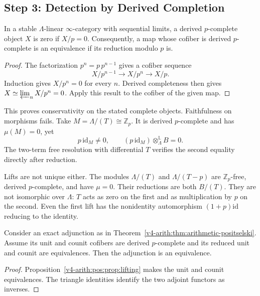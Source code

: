 \subsection{Step 3: Detection by Derived Completion}
\label{v4-arith:pos:step-3}

\begin{proposition}
\label{v4-arith:pos:prop:lifting}
In a stable \(\Lambda\)-linear \(\infty\)-category with sequential limits,
a derived \(p\)-complete object \(X\) is zero if \(X/p=0\).
Consequently, a map whose cofiber is derived \(p\)-complete
is an equivalence if its reduction modulo \(p\) is.
\end{proposition}
\begin{proof}
The factorization \(p^n=p\,p^{n-1}\) gives a cofiber sequence
\[
 X/p^{n-1}\longrightarrow X/p^n\longrightarrow X/p.
\]
Induction gives \(X/p^n=0\) for every \(n\).
Derived completeness then gives
\(X\simeq\varprojlim_n X/p^n=0\).
Apply this result to the cofiber of the given map.
\end{proof}

This proves conservativity on the stated complete objects.
Faithfulness on morphisms fails.
Take \(M=\Lambda/(T)\cong\mathbb Z_p\).
It is derived \(p\)-complete and has \(\mu(M)=0\), yet
\[
 p\,\mathrm{id}_M\ne0,
 \qquad
 (p\,\mathrm{id}_M)\otimes_\Lambda^{\mathbb L}B=0.
\]
The two-term free resolution with differential \(T\)
verifies the second equality directly after reduction.

Lifts are not unique either.
The modules \(\Lambda/(T)\) and \(\Lambda/(T-p)\)
are \(\mathbb Z_p\)-free, derived \(p\)-complete, and have
\(\mu=0\). Their reductions are both \(B/(T)\).
They are not isomorphic over \(\Lambda\): \(T\) acts as zero
on the first and as multiplication by \(p\) on the second.
Even the first lift has the nonidentity automorphism
\((1+p)\mathrm{id}\) reducing to the identity.

\begin{corollary}
\label{v4-arith:pos:cor:psi-equivalence}
Consider an exact adjunction as in
Theorem~\ref{v4-arith:thm:arithmetic-positselski}.
Assume its unit and counit cofibers are derived \(p\)-complete
and its reduced unit and counit are equivalences.
Then the adjunction is an equivalence.
\end{corollary}
\begin{proof}
Proposition~\ref{v4-arith:pos:prop:lifting} makes the unit
and counit equivalences. The triangle identities identify
the two adjoint functors as inverses.
\end{proof}

